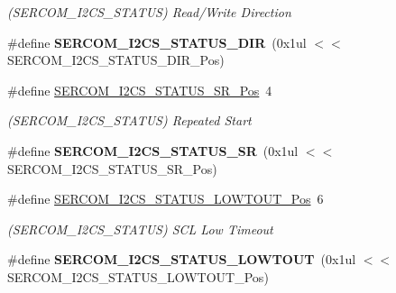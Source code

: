 \begin{DoxyCompactItemize}
\begin{DoxyCompactList}\small\item\em (S\+E\+R\+C\+O\+M\+\_\+\+I2\+C\+S\+\_\+\+S\+T\+A\+T\+U\+S) Read/\+Write Direction \end{DoxyCompactList}\item 
\hypertarget{group___s_a_m_l21___s_e_r_c_o_m_gafa1b39cd69568762170e373892714628}{}\#define {\bfseries S\+E\+R\+C\+O\+M\+\_\+\+I2\+C\+S\+\_\+\+S\+T\+A\+T\+U\+S\+\_\+\+D\+I\+R}~(0x1ul $<$$<$ S\+E\+R\+C\+O\+M\+\_\+\+I2\+C\+S\+\_\+\+S\+T\+A\+T\+U\+S\+\_\+\+D\+I\+R\+\_\+\+Pos)\label{group___s_a_m_l21___s_e_r_c_o_m_gafa1b39cd69568762170e373892714628}

\item 
\hypertarget{group___s_a_m_l21___s_e_r_c_o_m_ga69162462f8ab1b129dda7cf794adeb2f}{}\#define \hyperlink{group___s_a_m_l21___s_e_r_c_o_m_ga69162462f8ab1b129dda7cf794adeb2f}{S\+E\+R\+C\+O\+M\+\_\+\+I2\+C\+S\+\_\+\+S\+T\+A\+T\+U\+S\+\_\+\+S\+R\+\_\+\+Pos}~4\label{group___s_a_m_l21___s_e_r_c_o_m_ga69162462f8ab1b129dda7cf794adeb2f}

\begin{DoxyCompactList}\small\item\em (S\+E\+R\+C\+O\+M\+\_\+\+I2\+C\+S\+\_\+\+S\+T\+A\+T\+U\+S) Repeated Start \end{DoxyCompactList}\item 
\hypertarget{group___s_a_m_l21___s_e_r_c_o_m_ga4722f6fa7a3d5e44f3b02bcdae64beb9}{}\#define {\bfseries S\+E\+R\+C\+O\+M\+\_\+\+I2\+C\+S\+\_\+\+S\+T\+A\+T\+U\+S\+\_\+\+S\+R}~(0x1ul $<$$<$ S\+E\+R\+C\+O\+M\+\_\+\+I2\+C\+S\+\_\+\+S\+T\+A\+T\+U\+S\+\_\+\+S\+R\+\_\+\+Pos)\label{group___s_a_m_l21___s_e_r_c_o_m_ga4722f6fa7a3d5e44f3b02bcdae64beb9}

\item 
\hypertarget{group___s_a_m_l21___s_e_r_c_o_m_ga11dcbc9f9772e3b104206fc81284de1b}{}\#define \hyperlink{group___s_a_m_l21___s_e_r_c_o_m_ga11dcbc9f9772e3b104206fc81284de1b}{S\+E\+R\+C\+O\+M\+\_\+\+I2\+C\+S\+\_\+\+S\+T\+A\+T\+U\+S\+\_\+\+L\+O\+W\+T\+O\+U\+T\+\_\+\+Pos}~6\label{group___s_a_m_l21___s_e_r_c_o_m_ga11dcbc9f9772e3b104206fc81284de1b}

\begin{DoxyCompactList}\small\item\em (S\+E\+R\+C\+O\+M\+\_\+\+I2\+C\+S\+\_\+\+S\+T\+A\+T\+U\+S) S\+C\+L Low Timeout \end{DoxyCompactList}\item 
\hypertarget{group___s_a_m_l21___s_e_r_c_o_m_ga07292e20d1107ae1d3a933dedd3a5764}{}\#define {\bfseries S\+E\+R\+C\+O\+M\+\_\+\+I2\+C\+S\+\_\+\+S\+T\+A\+T\+U\+S\+\_\+\+L\+O\+W\+T\+O\+U\+T}~(0x1ul $<$$<$ S\+E\+R\+C\+O\+M\+\_\+\+I2\+C\+S\+\_\+\+S\+T\+A\+T\+U\+S\+\_\+\+L\+O\+W\+T\+O\+U\+T\+\_\+\+Pos)\label{group___s_a_m_l21___s_e_r_c_o_m_ga07292e20d1107ae1d3a933dedd3a5764}


\end{DoxyCompactItemize}

